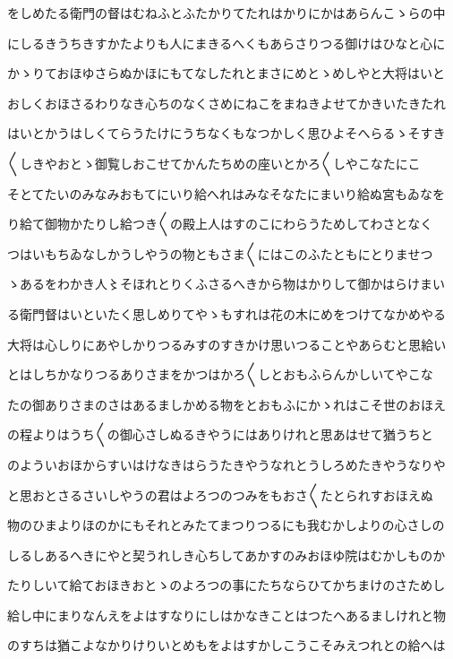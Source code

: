 \documentclass[a4paper,11pt,landscape]{ltjtarticle}
\begin{document}
をしめたる衛門の督はむねふとふたかりてたれはかりにかはあらんこゝらの中
\par\medskip
にしるきうちきすかたよりも人にまきるへくもあらさりつる御けはひなと心に
\par\medskip
かゝりておほゆさらぬかほにもてなしたれとまさにめとゝめしやと大将はいと
\par\medskip
おしくおほさるわりなき心ちのなくさめにねこをまねきよせてかきいたきたれ
\par\medskip
はいとかうはしくてらうたけにうちなくもなつかしく思ひよそへらるゝそすき
\par\medskip
〱しきやおとゝ御覧しおこせてかんたちめの座いとかろ〱しやこなたにこ
\par\medskip
そとてたいのみなみおもてにいり給へれはみなそなたにまいり給ぬ宮もゐなを
\par\medskip
り給て御物かたりし給つき〱の殿上人はすのこにわらうためしてわさとなく
\par\medskip
つはいもちゐなしかうしやうの物ともさま〱にはこのふたともにとりませつ
\par\medskip
ゝあるをわかき人〻そほれとりくふさるへきから物はかりして御かはらけまい
\par\medskip
る衛門督はいといたく思しめりてやゝもすれは花の木にめをつけてなかめやる
\par\medskip
大将は心しりにあやしかりつるみすのすきかけ思いつることやあらむと思給い
\par\medskip
とはしちかなりつるありさまをかつはかろ〱しとおもふらんかしいてやこな
\par\medskip
たの御ありさまのさはあるましかめる物をとおもふにかゝれはこそ世のおほえ
\par\medskip
の程よりはうち〱の御心さしぬるきやうにはありけれと思あはせて猶うちと
\par\medskip
のよういおほからすいはけなきはらうたきやうなれとうしろめたきやうなりや
\par\medskip
と思おとさるさいしやうの君はよろつのつみをもおさ〱たとられすおほえぬ
\par\medskip
物のひまよりほのかにもそれとみたてまつりつるにも我むかしよりの心さしの
\par\medskip
しるしあるへきにやと契うれしき心ちしてあかすのみおほゆ院はむかしものか
\par\medskip
たりしいて給ておほきおとゝのよろつの事にたちならひてかちまけのさためし
\par\medskip
給し中にまりなんえをよはすなりにしはかなきことはつたへあるましけれと物
\par\medskip
のすちは猶こよなかりけりいとめもをよはすかしこうこそみえつれとの給へは
\end{document}
